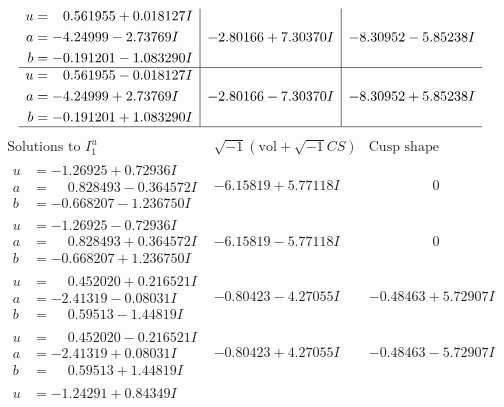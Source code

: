 \documentclass[1p]{elsarticle_modified}
\theoremstyle{definition}
\newcommand{\I}{\sqrt{-1}}
\begin{document}
$$\begin{array}{c|c|c}
\begin{aligned}
u &= \phantom{-}0.561955 + 0.018127 I \\
a &= -4.24999 - 2.73769 I \\
b &= -0.191201 - 1.083290 I\end{aligned}
 & -2.80166 + 7.30370 I & -8.30952 - 5.85238 I \\ \hline\begin{aligned}
u &= \phantom{-}0.561955 - 0.018127 I \\
a &= -4.24999 + 2.73769 I \\
b &= -0.191201 + 1.083290 I\end{aligned}
 & -2.80166 - 7.30370 I & -8.30952 + 5.85238 I\\
 \hline 
 \end{array}$$\newpage$$\begin{array}{c|c|c}  
\text{Solutions to }I^u_{1}& \I (\text{vol} + \sqrt{-1}CS) & \text{Cusp shape}\\
 \hline 
\begin{aligned}
u &= -1.26925 + 0.72936 I \\
a &= \phantom{-}0.828493 - 0.364572 I \\
b &= -0.668207 - 1.236750 I\end{aligned}
 & -6.15819 + 5.77118 I & \phantom{-0.000000 } 0 \\ \hline\begin{aligned}
u &= -1.26925 - 0.72936 I \\
a &= \phantom{-}0.828493 + 0.364572 I \\
b &= -0.668207 + 1.236750 I\end{aligned}
 & -6.15819 - 5.77118 I & \phantom{-0.000000 } 0 \\ \hline\begin{aligned}
u &= \phantom{-}0.452020 + 0.216521 I \\
a &= -2.41319 - 0.08031 I \\
b &= \phantom{-}0.59513 - 1.44819 I\end{aligned}
 & -0.80423 - 4.27055 I & -0.48463 + 5.72907 I \\ \hline\begin{aligned}
u &= \phantom{-}0.452020 - 0.216521 I \\
a &= -2.41319 + 0.08031 I \\
b &= \phantom{-}0.59513 + 1.44819 I\end{aligned}
 & -0.80423 + 4.27055 I & -0.48463 - 5.72907 I \\ \hline\begin{aligned}
u &= -1.24291 + 0.84349 I \\

\end{aligned}
\end{array}$$
\end{document}
